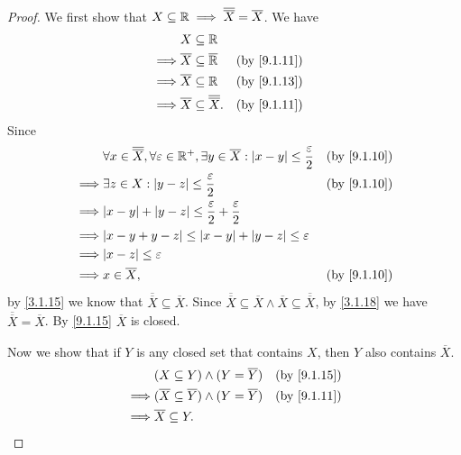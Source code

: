 \begin{proof}
  We first show that \(X \subseteq \mathbb{R} \implies \overline{\overline{X}} = \overline{X}\).
  We have
  \begin{align*}
             & X \subseteq \R                                                   \\
    \implies & \overline{X} \subseteq \overline{\R}            &  & \by{9.1.11} \\
    \implies & \overline{X} \subseteq \R                       &  & \by{9.1.13} \\
    \implies & \overline{X} \subseteq \overline{\overline{X}}. &  & \by{9.1.11}
  \end{align*}
  Since
  \begin{align*}
             & \forall x \in \overline{\overline{X}}, \forall \varepsilon \in \R^+, \exists y \in \overline{X} : \abs{x - y} \leq \dfrac{\varepsilon}{2} &  & \by{9.1.10} \\
    \implies & \exists z \in X : \abs{y - z} \leq \dfrac{\varepsilon}{2}                                                                                 &  & \by{9.1.10} \\
    \implies & \abs{x - y} + \abs{y - z} \leq \dfrac{\varepsilon}{2} + \dfrac{\varepsilon}{2}                                                                             \\
    \implies & \abs{x - y + y - z} \leq \abs{x - y} + \abs{y - z} \leq \varepsilon                                                                                        \\
    \implies & \abs{x - z} \leq \varepsilon                                                                                                                               \\
    \implies & x \in \overline{X},                                                                                                                       &  & \by{9.1.10}
  \end{align*}
  by \cref{3.1.15} we know that \(\overline{\overline{X}} \subseteq \overline{X}\).
  Since \(\overline{\overline{X}} \subseteq \overline{X} \land \overline{X} \subseteq \overline{\overline{X}}\), by \cref{3.1.18} we have \(\overline{\overline{X}} = \overline{X}\).
  By \cref{9.1.15} \(\overline{X}\) is closed.

  Now we show that if \(Y\) is any closed set that contains \(X\), then \(Y\) also contains \(\overline{X}\).
  \begin{align*}
             & (X \subseteq Y) \land (Y = \overline{Y})                       &  & \by{9.1.15} \\
    \implies & (\overline{X} \subseteq \overline{Y}) \land (Y = \overline{Y}) &  & \by{9.1.11} \\
    \implies & \overline{X} \subseteq Y.
  \end{align*}
\end{proof}

